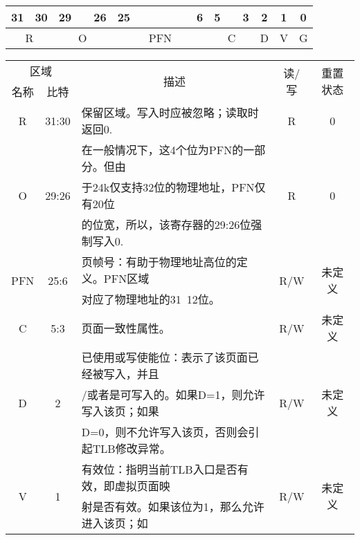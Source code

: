 \begin{enumerate}[(1)]
\begin{table}[H]
\centering
\begin{tabular}{cccccccccccccccccc}
31&30&29&&26&25&&&&&&6&5&&3&2&1&0\\
\hline
\multicolumn{2}{|c|}{R}&
\multicolumn{3}{c|}{O}&
\multicolumn{7}{c|}{PFN}&
\multicolumn{3}{c|}{C}&
\multicolumn{1}{c|}{D}&
\multicolumn{1}{c|}{V}&
\multicolumn{1}{c|}{G}\\
\hline
\end{tabular}
\end{table}

\begin{table}[H]
\centering
\begin{tabular}{|c|c|c|c|c|}
\hline
\multicolumn{2}{|c|}{区域}&
\multirow{2}{*}{描述}&
\multirow{2}{*}{读/写}&
\multirow{2}{*}{重置状态}\\
\cline{1-2}
名称&比特&&&\\
\hline
R&31:30&
\multicolumn{1}{l|}{保留区域。写入时应被忽略；读取时返回0.}&
R&0\\
\hline
\multirow{3}{*}{O}&
\multirow{3}{*}{29:26}&
\multicolumn{1}{l|}{在一般情况下，这4个位为PFN的一部分。但由}&
\multirow{3}{*}{R}&
\multirow{3}{*}{0}\\
&&
\multicolumn{1}{l|}{于24k仅支持32位的物理地址，PFN仅有20位}&
&\\
&&
\multicolumn{1}{l|}{的位宽，所以，该寄存器的29:26位强制写入0.}&
&\\
\hline
\multirow{2}{*}{PFN}&
\multirow{2}{*}{25:6}&
\multicolumn{1}{l|}{页帧号：有助于物理地址高位的定义。PFN区域}&
\multirow{2}{*}{R/W}&
\multirow{2}{*}{未定义}\\
&&
\multicolumn{1}{l|}{对应了物理地址的31~12位。}&
&\\
\hline
C&5:3&
\multicolumn{1}{l|}{页面一致性属性。}&
R/W&未定义\\
\hline
\multirow{3}{*}{D}&
\multirow{3}{*}{2}&
\multicolumn{1}{l|}{已使用或写使能位：表示了该页面已经被写入，并且}&
\multirow{3}{*}{R/W}&
\multirow{3}{*}{未定义}\\
&&
\multicolumn{1}{l|}{/或者是可写入的。如果D=1，则允许写入该页；如果}&
&\\
&&
\multicolumn{1}{l|}{D=0，则不允许写入该页，否则会引起TLB修改异常。}&
&\\
\hline
\multirow{4}{*}{V}&
\multirow{4}{*}{1}&
\multicolumn{1}{l|}{有效位：指明当前TLB入口是否有效，即虚拟页面映}&
\multirow{4}{*}{R/W}&
\multirow{4}{*}{未定义}\\
&&
\multicolumn{1}{l|}{射是否有效。如果该位为1，那么允许进入该页；如}&
&\\

\end{tabular}
\end{table}
\end{enumerate}
